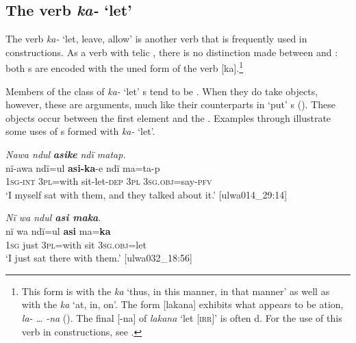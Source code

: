 
\newpage

\subsection{The verb \textit{ka-} ‘let’}\label{sec:9.2.3}


The verb \textit{ka-} ‘let, leave, allow’ is another verb that is frequently used in  constructions. As a verb with  telic , there is no distinction made between  and  : both s are encoded with the uned form of the verb [ka].\footnote{This form is  with the  \textit{ka} ‘thus, in this manner, in that manner’ as well as with the  \textit{ka} ‘at, in, on’. The  form [lakana] exhibits what appears to be ation, \textit{la- … -na} (). The final [-na] of \textit{lakana} ‘let [\textsc{irr]’} is often d. For the use of this verb in  constructions, see .}

  Members of the class of \textit{ka-} ‘let’ s tend to be . When they do take objects, however, these are  arguments, much like their counterparts in ‘put’ s (). These objects occur between the first element and the . Examples  through  illustrate some uses of s formed with \textit{ka-} ‘let’.

\ea%
    \label{ex:phrase:88}
          \textit{Nawa ndul} \textbf{\textit{asike}} \textit{ndï matap.}\\
\gll    nï-awa    ndï=ul    \textbf{asi-ka}{}-e  ndï  ma=ta-p\\
    1\textsc{sg-int}  3\textsc{pl}=with  sit-let\textsc{{}-dep}  \textsc{3pl}  \textsc{3sg.obj}=say-\textsc{pfv}\\
\glt `I myself sat with them, and they talked about it.’ [ulwa014\_29:14]
\z

\ea%
    \label{ex:phrase:89}
          \textit{Nï wa ndul \textbf{asi maka}}.\\
\gll nï    wa  ndï=ul    \textbf{asi}  ma=\textbf{ka}\\
    1\textsc{sg}  just  3\textsc{pl}=with  sit  3\textsc{sg.obj}=let\\
\glt `I just sat there with them.’ [ulwa032\_18:56]
\z

